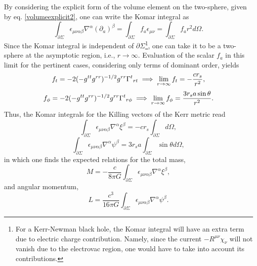 \documentclass[
12pt,		%
openright,	%
twoside,  %
a4paper,			%
chapter=TITLE,		%
english,			%
french,				%
spanish,			%
brazil				%
]{USPSC-classe/USPSC}
\begin{document}
By considering the explicit form of the volume element on the two-sphere, given by eq. \ref{volumeexplicit2}, one can write the Komar integral as
\begin{equation}
    \int_{\partial\Sigma}\epsilon_{\mu\nu\alpha\beta}\nabla^{\alpha}(\partial_a)^{\beta}=\int_{\partial\Sigma}f_a\epsilon_{\mu\nu}=\int_{\partial\Sigma}f_ar^2d\Omega.
\end{equation}
Since the Komar integral is independent of $\partial\Sigma$\footnote{For a Kerr-Newman black hole, the Komar integral will have an extra term due to electric charge contribution. Namely, since the current $-R^{\mu\nu}\chi_{\nu}$ will not vanish due to the electrovac region, one would have to take into account its contributions.}, one can take it to be a two-sphere at the asymptotic region, i.e., $r\to\infty$. Evaluation of the scalar $f_a$ in this limit for the pertinent cases, considering only terms of dominant order, yields
\begin{equation}
    f_t=-2(-g^{tt}g^{rr})^{-1/2}g^{rr}\Gamma^{t}\mathstrut_{r t}\implies\lim_{r\to\infty}f_t=-\frac{cr_s}{r^2},
\end{equation}
\begin{equation}
    f_{\phi}=-2(-g^{tt}g^{rr})^{-1/2}g^{rr}\Gamma^{t}\mathstrut_{r \phi}\implies\lim_{r\to\infty}f_{\phi}=\frac{3r_sa\sin{\theta}}{r^2}.
\end{equation}
Thus, the Komar integrals for the Killing vectors of the Kerr metric read
\begin{equation}
    \int_{\partial\Sigma}\epsilon_{\mu\nu\alpha\beta}\nabla^{\alpha}\xi^{\beta}=-cr_s\int_{\partial\Sigma}d\Omega,
\end{equation}
\begin{equation}
    \int_{\partial\Sigma}\epsilon_{\mu\nu\alpha\beta}\nabla^{\alpha}\psi^{\beta}=3r_sa\int_{\partial\Sigma}\sin{\theta}d\Omega,
\end{equation}
in which one finds the expected relations for the total mass,
\begin{equation}\label{MKerr}
    M=-\frac{c}{8\pi G}\int_{\partial\Sigma}\epsilon_{\mu\nu\alpha\beta}\nabla^{\alpha}\xi^{\beta},
\end{equation}
and angular momentum,
\begin{equation}\label{JKerr}
   L=\frac{c^3}{16\pi G}\int_{\partial\Sigma}\epsilon_{\mu\nu\alpha\beta}\nabla^{\alpha}\psi^{\beta}.
\end{equation}
\end{document}
